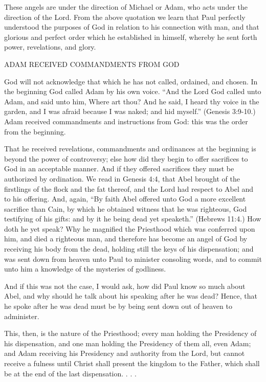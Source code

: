 These angels are under the direction of Michael or Adam, who acts under the direction of the
Lord. From the above quotation we learn that Paul perfectly understood the purposes of God
in relation to his connection with man, and that glorious and perfect order which he
established in himself, whereby he sent forth power, revelations, and glory.

ADAM RECEIVED COMMANDMENTS FROM GOD

God will not acknowledge that which he has not called, ordained, and chosen. In the
beginning God called Adam by his own voice. ``And the Lord God called unto Adam, and
said unto him, Where art thou? And he said, I heard thy voice in the garden, and I was afraid
because I was naked; and hid myself.'' (Genesis 3:9-10.) Adam received commandments and
instructions from God: this was the order from the beginning.

That he received revelations, commandments and ordinances at the beginning is beyond the
power of controversy; else how did they begin to offer sacrifices to God in an acceptable
manner. And if they offered sacrifices they must be authorized by ordination. We read in
Genesis 4:4, that Abel brought of the firstlings of the flock and the fat thereof, and the Lord
had respect to Abel and to his offering. And, again, ``By faith Abel offered unto God a more
excellent sacrifice than Cain, by which he obtained witness that he was righteous, God
testifying of his gifts: and by it he being dead yet speaketh.'' (Hebrews 11:4.) How doth he
yet speak? Why he magnified the Priesthood which was conferred upon him, and died a
righteous man, and therefore has become an angel of God by receiving his body from the
dead, holding still the keys of his dispensation; and was sent down from heaven unto Paul to
minister consoling words, and to commit unto him a knowledge of the mysteries of
godliness.

And if this was not the case, I would ask, how did Paul know so much about Abel, and why
should he talk about his speaking after he was dead? Hence, that he spoke after he was dead
must be by being sent down out of heaven to administer.

This, then, is the nature of the Priesthood; every man holding the Presidency of his
dispensation, and one man holding the Presidency of them all, even Adam; and Adam
receiving his Presidency and authority from the Lord, but cannot receive a fulness until
Christ shall present the kingdom to the Father, which shall be at the end of the last
dispensation. . . .

